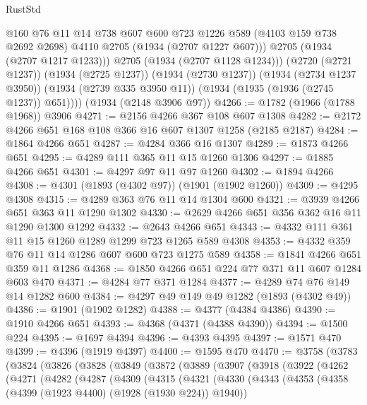 \begin{lexlean}{RustStd}
\begin{coremodule}
              @160
              @76
              @11
              @14
              @738
              @607
              @600
              @723
              @1226
              @589
              (@4103 @159 @738 @2692 @2698)
              @4110
              @2705
              (@1934 (@2707 @1227 @607)))
            @2705
            (@1934 (@2707 @1217 @1233)))
          @2705
          (@1934 (@2707 @1128 @1234)))
        (@2720 (@2721 @1237))
        (@1934 (@2725 @1237))
        (@1934 (@2730 @1237))
        (@1934 (@2734 @1237 @3950))
        (@1934 (@2739 @335 @3950 @11))
        (@1934 (@1935 (@1936 (@2745 @1237)) @651))))
    (@1934 (@2148 @3906 @97))
@4266 := @1782 (@1966 (@1788 @1968)) @3906
@4271 := @2156 @4266 @367 @108 @607 @1308
@4282 := @2172 @4266 @651 @168 @108 @366 @16 @607 @1307 @1258 (@2185 @2187)
@4284 := @1864 @4266 @651
@4287 := @4284 @366 @16 @1307
@4289 := @1873 @4266 @651
@4295 := @4289 @111 @365 @11 @15 @1260 @1306
@4297 := @1885 @4266 @651
@4301 := @4297 @97 @11 @97 @1260
@4302 := @1894 @4266
@4308 := @4301 (@1893 (@4302 @97)) (@1901 (@1902 @1260))
@4309 := @4295 @4308
@4315 := @4289 @363 @76 @11 @14 @1304 @600
@4321 := @3939 @4266 @651 @363 @11 @1290 @1302
@4330 := @2629 @4266 @651 @356 @362 @16 @11 @1290 @1300 @1292
@4332 := @2643 @4266 @651
@4343 := @4332 @111 @361 @11 @15 @1260 @1289 @1299 @723 @1265 @589 @4308
@4353 := @4332 @359 @76 @11 @14 @1286 @607 @600 @723 @1275 @589
@4358 := @1841 @4266 @651 @359 @11 @1286
@4368 := @1850 @4266 @651 @224 @77 @371 @11 @607 @1284 @603 @470
@4371 := @4284 @77 @371 @1284
@4377 := @4289 @74 @76 @149 @14 @1282 @600
@4384 := @4297 @49 @149 @49 @1282 (@1893 (@4302 @49))
@4386 := @1901 (@1902 @1282)
@4388 := @4377 (@4384 @4386)
@4390 := @1910 @4266 @651
@4393 := @4368 (@4371 (@4388 @4390))
@4394 := @1500 @224
@4395 := @1697 @4394
@4396 := @4393 @4395
@4397 := @1571 @470
@4399 := @4396 (@1919 @4397)
@4400 := @1595 @470
@4470 := @3758
    (@3783
      (@3824
        (@3826
          (@3828
            (@3849
              (@3872
                (@3889
                  (@3907
                    (@3918
                      (@3922
                        (@4262
                          (@4271
                            (@4282
                              (@4287
                                (@4309
                                  (@4315
                                    (@4321
                                      (@4330
                                        (@4343
                                          (@4353
                                            (@4358 (@4399 (@1923 @4400) (@1928 (@1930 @224)) @1940))

\end{coremodule}
\end{lexlean}

